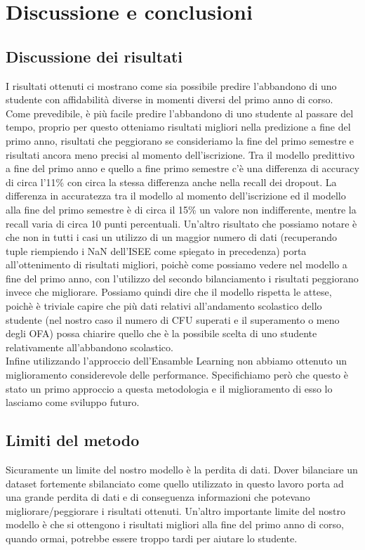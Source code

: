 \documentclass[../../Report.tex]{subfiles}
\begin{document}
    \chapter{Discussione e conclusioni}
    \section{Discussione dei risultati}
I risultati ottenuti ci mostrano come sia possibile predire l'abbandono di uno studente con affidabilità diverse in momenti diversi del primo anno di corso. Come prevedibile, è più facile predire l'abbandono di uno studente al passare del tempo, proprio per questo otteniamo risultati migliori nella predizione a fine del primo anno, risultati che peggiorano se consideriamo la fine del primo semestre e risultati ancora meno precisi al momento dell'iscrizione. Tra il modello predittivo a fine del primo anno e quello a fine primo semestre c'è una differenza di accuracy di circa l'11\% con circa la stessa differenza anche nella recall dei dropout. La differenza in accuratezza tra il modello al momento dell'iscrizione ed il modello alla fine del primo semestre è di circa il 15\% un valore non indifferente, mentre la recall varia di circa 10 punti percentuali. Un'altro risultato che possiamo notare è che non in tutti i casi un utilizzo di un maggior numero di dati (recuperando tuple riempiendo i NaN dell'ISEE come spiegato in precedenza) porta all'ottenimento di risultati migliori, poichè come possiamo vedere nel modello a fine del primo anno, con l'utilizzo del secondo bilanciamento i risultati peggiorano invece che migliorare. Possiamo quindi dire che il modello rispetta le attese, poichè è triviale capire che più dati relativi all'andamento scolastico dello studente (nel nostro caso il numero di CFU superati e il superamento o meno degli OFA) possa chiarire quello che è la possibile scelta di uno studente relativamente all'abbandono scolastico.\\
Infine utilizzando l'approccio dell'Ensamble Learning non abbiamo ottenuto un miglioramento considerevole delle performance. Specifichiamo però che questo è stato un primo approccio a questa metodologia e il miglioramento di esso lo lasciamo come sviluppo futuro.


\section{Limiti del metodo}
Sicuramente un limite del nostro modello è la perdita di dati. Dover bilanciare un dataset fortemente sbilanciato come quello utilizzato in questo lavoro porta ad una grande perdita di dati e di conseguenza informazioni che potevano migliorare/peggiorare i risultati ottenuti. Un'altro importante limite del nostro modello è che si ottengono i risultati migliori alla fine del primo anno di corso, quando ormai, potrebbe essere troppo tardi per aiutare lo studente.  
\end{document}
